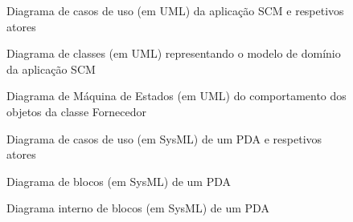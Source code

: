 \documentclass[12pt,a4paper]{article}
\begin{document}
\begin{landscape}
  \begin{figure}
    \centering
    
    \caption{Diagrama de casos de uso (em UML) da aplicação SCM e respetivos atores}
    \label{fig:uml1}
  \end{figure}
\end{landscape}

\begin{landscape}
  \begin{figure}
    \centering
    
    \caption{Diagrama de classes (em UML) representando o modelo de domínio da aplicação SCM}
    \label{fig:uml2}
  \end{figure}
\end{landscape}

\begin{landscape}
  \begin{figure}
    \centering
    
    \caption{Diagrama de Máquina de Estados (em UML) do comportamento dos objetos da classe Fornecedor}
    \label{fig:uml3}
  \end{figure}
\end{landscape}

\begin{landscape}
  \begin{figure}
    \centering
    
    \caption{Diagrama de casos de uso (em SysML) de um PDA e respetivos atores}
    \label{fig:sysml1}
  \end{figure}
\end{landscape}

\begin{landscape}
  \begin{figure}
    \centering
    
    \caption{Diagrama de blocos (em SysML) de um PDA}
    \label{fig:sysml2}
  \end{figure}
\end{landscape}

\begin{landscape}
  \begin{figure}
    \centering
    
    \caption{Diagrama interno de blocos (em SysML) de um PDA}
    \label{fig:sysml3}
  \end{figure}
\end{landscape}
\end{document}
